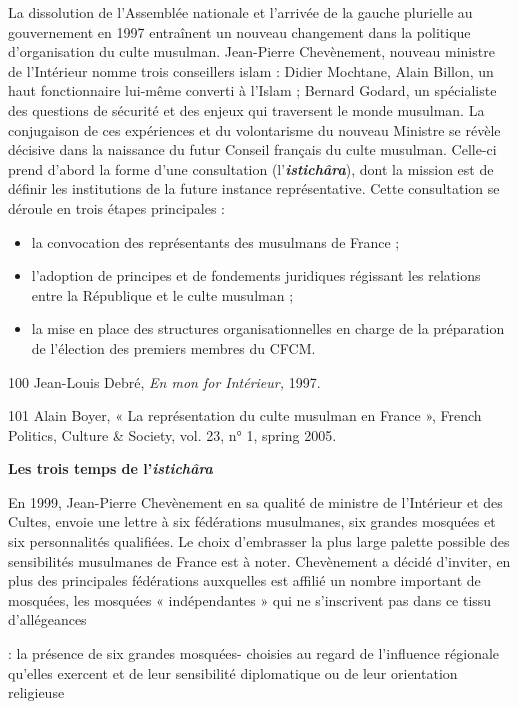 La dissolution de l'Assemblée nationale et l'arrivée de la gauche
plurielle au gouvernement en 1997 entraînent un nouveau changement dans
la politique d'organisation du culte musulman. Jean-Pierre Chevènement,
nouveau ministre de l'Intérieur nomme trois conseillers islam : Didier
Mochtane, Alain Billon, un haut fonctionnaire lui-même converti à
l'Islam ; Bernard Godard, un spécialiste des questions de sécurité et
des enjeux qui traversent le monde musulman. La conjugaison de ces
expériences et du volontarisme du nouveau Ministre se révèle décisive
dans la naissance du futur Conseil français du culte musulman. Celle-ci
prend d'abord la forme d'une consultation (l'\emph{\textbf{istichâra}}),
dont la mission est de définir les institutions de la future instance
représentative. Cette consultation se déroule en trois étapes
principales :


\begin{itemize}
\item
  la convocation des représentants des musulmans de France ;
\item
  l'adoption de principes et de fondements juridiques régissant les
  relations entre la République et le culte musulman ;
\item
  la mise en place des structures organisationnelles en charge de la
  préparation de l'élection des premiers membres du CFCM.
\end{itemize}


100 Jean-Louis Debré, \emph{En mon for Intérieur,} 1997.

101 Alain Boyer, « La représentation du culte musulman en France »,
French Politics, Culture \& Society, vol. 23, n° 1, spring 2005.



\textbf{Les trois temps de l'\emph{istichâra}}

En 1999, Jean-Pierre Chevènement en sa qualité de ministre de
l'Intérieur et des Cultes, envoie une lettre à six fédérations
musulmanes, six grandes mosquées et six personnalités qualifiées. Le
choix d'embrasser la plus large palette possible des sensibilités
musulmanes de France est à noter. Chevènement a décidé d'inviter, en
plus des principales fédérations auxquelles est affilié un nombre
important de mosquées, les mosquées « indépendantes » qui ne
s'inscrivent pas dans ce tissu d'allégeances

: la présence de six grandes mosquées- choisies au regard de l'influence
régionale qu'elles exercent et de leur sensibilité diplomatique ou de
leur orientation religieuse

